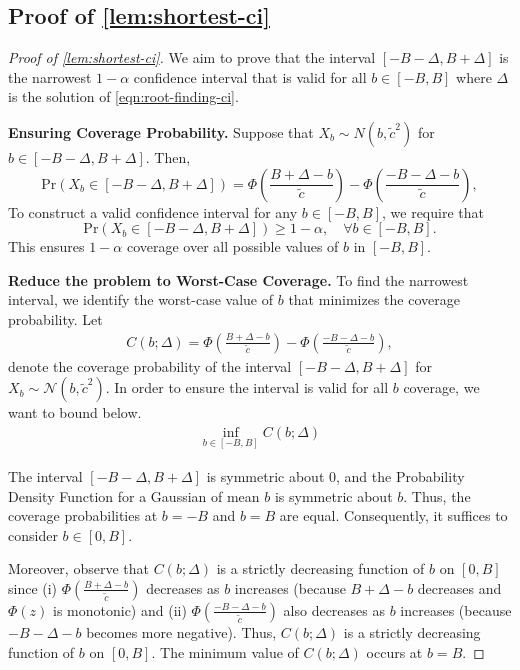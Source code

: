 \subsection{Proof of \cref{lem:shortest-ci}}
\label{proof:shortest-ci}
\begin{proof}[Proof of \cref{lem:shortest-ci}]

We aim to prove that the interval $[-B - \Delta, B + \Delta]$ is the narrowest $1 - \alpha$ confidence interval that is valid for all $b \in [-B, B]$ where $\Delta$ is the solution of \cref{eqn:root-finding-ci}.

\textbf{Ensuring Coverage Probability.} Suppose that $X_b \sim N(b, \tilde{c}^2)$ for $b \in [-B - \Delta, B + \Delta]$. Then,
\[
\mathrm{Pr}(X_b \in [-B - \Delta, B + \Delta]) = \Phi\left(\frac{B + \Delta - b}{\tilde{c}}\right) - \Phi\left(\frac{-B - \Delta - b}{\tilde{c}}\right),
\]
To construct a valid confidence interval for any $b \in [-B,B]$, we require that
\[
\mathrm{Pr}(X_b \in [-B - \Delta, B + \Delta]) \geq 1 - \alpha, \quad \forall b \in [-B, B].
\]
This ensures  $1-\alpha$ coverage over all possible values of $b$ in $[-B, B]$.

\textbf{Reduce the problem to Worst-Case Coverage.} To find the narrowest interval, we identify the worst-case value of $b$ that minimizes the coverage probability. Let
\begin{align*}
C(b; \Delta) = \Phi\left(\frac{B + \Delta - b}{\tilde{c}}\right) - \Phi\left(\frac{-B - \Delta - b}{\tilde{c}}\right),
\end{align*}
denote the coverage probability of the interval $[-B-\Delta, B+ \Delta]$ for $X_b\sim \mathcal{N}(b, \tilde{c}^2)$.
In order to ensure the interval is valid for all $b$ coverage, we want to bound below.
\begin{align*}
\inf_{b \in [-B, B]} C(b; \Delta)
\end{align*}

The interval $[-B - \Delta, B + \Delta]$ is symmetric about $0$, and the Probability Density Function for a Gaussian of mean $b$ is symmetric about $b$. Thus, the coverage probabilities at $b = -B$ and $b = B$ are equal. Consequently, it suffices to consider $b \in [0, B]$.

Moreover, observe that $C(b; \Delta)$ is a strictly decreasing function of $b$ on $[0, B]$ since (i) $\Phi\left(\frac{B + \Delta - b}{\tilde{c}}\right)$ decreases as $b$ increases (because $B + \Delta - b$ decreases and $\Phi(z)$ is monotonic) and (ii) $\Phi\left(\frac{-B - \Delta - b}{\tilde{c}}\right)$ also decreases as $b$ increases (because $-B - \Delta - b$ becomes more negative). Thus, $C(b; \Delta)$ is a strictly decreasing function of $b$ on $[0, B]$. The minimum value of $C(b; \Delta)$ occurs at $b = B$.


\end{proof}
